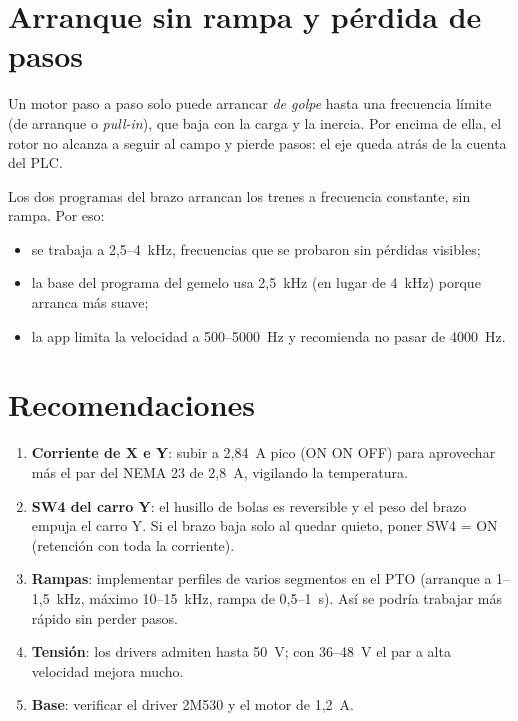 \section{Arranque sin rampa y pérdida de pasos}
Un motor paso a paso solo puede arrancar \emph{de golpe} hasta una frecuencia límite (de arranque o \emph{pull-in}), que baja con la carga y la inercia. Por encima de ella, el rotor no alcanza a seguir al campo y pierde pasos: el eje queda atrás de la cuenta del PLC.

Los dos programas del brazo arrancan los trenes a frecuencia constante, sin rampa. Por eso:
\begin{itemize}
\item se trabaja a 2,5--4~kHz, frecuencias que se probaron sin pérdidas visibles;
\item la base del programa del gemelo usa 2,5~kHz (en lugar de 4~kHz) porque arranca más suave;
\item la app limita la velocidad a 500--5000~Hz y recomienda no pasar de 4000~Hz.
\end{itemize}

\section{Recomendaciones}
\begin{enumerate}
\item \textbf{Corriente de X e Y}: subir a 2,84~A pico (ON ON OFF) para aprovechar más el par del NEMA 23 de 2,8~A, vigilando la temperatura.
\item \textbf{SW4 del carro Y}: el husillo de bolas es reversible y el peso del brazo empuja el carro Y. Si el brazo baja solo al quedar quieto, poner SW4 = ON (retención con toda la corriente).
\item \textbf{Rampas}: implementar perfiles de varios segmentos en el PTO (arranque a 1--1,5~kHz, máximo 10--15~kHz, rampa de 0,5--1~s). Así se podría trabajar más rápido sin perder pasos.
\item \textbf{Tensión}: los drivers admiten hasta 50~V; con 36--48~V el par a alta velocidad mejora mucho.
\item \textbf{Base}: verificar el driver 2M530 y el motor de 1,2~A.
\end{enumerate}
